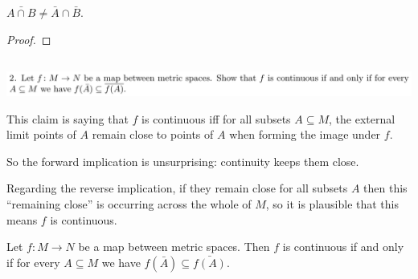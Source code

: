 \documentclass[12pt]{article}
\begin{document}
\begin{claim*}
  $\bar{A \cap B} \neq \bar A \cap \bar B$.
\end{claim*}
\begin{proof}
\end{proof}

\newpage
\subsection{}



\begin{mdframed}
\includegraphics[width=400pt]{img/oxford-a2-2-2.png}
\end{mdframed}

\begin{mdframed}
\begin{intuition*}
  This claim is saying that $f$ is continuous iff for all subsets $A \subseteq M$, the external
  limit points of $A$ remain close to points of $A$ when forming the image under $f$.

  So the forward implication is unsurprising: continuity keeps them close.

  Regarding the reverse implication, if they remain close for all subsets $A$ then this ``remaining
  close'' is occurring across the whole of $M$, so it is plausible that this means $f$ is
  continuous.
\end{intuition*}
\end{mdframed}

\begin{claim*}
  Let $f:M \to N$ be a map between metric spaces. Then $f$ is continuous if and only if for every
  $A \subseteq M$ we have $f(\bar A) \subseteq \bar{f(A)}$.
\end{claim*}
\end{document}
